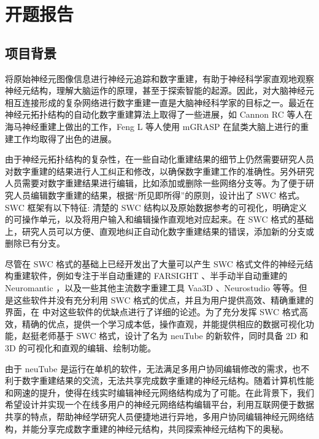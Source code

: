 \chapter*{\zjutitlec 开题报告}

\section{项目背景}
将原始神经元图像信息进行神经元追踪和数字重建，有助于神经科学家直观地观察神经元结构，理解大脑运作的原理，甚至于探索智能的起源。因此，对大脑神经元相互连接形成的复杂网络进行数字重建一直是大脑神经科学家的目标之一。最近在神经元拓扑结构的自动化数字重建算法上取得了一些进展，如 Cannon RC 等人在海马神经重建上做出的工作\cite{Cannon1998An}，Feng L 等人使用 mGRASP 在鼠类大脑上进行的重建工作\cite{Druckmann2014Structured}均取得了出色的进展。

由于神经元拓扑结构的复杂性，在一些自动化重建结果的细节上仍然需要研究人员对数字重建的结果进行人工纠正和修改，以确保数字重建工作的准确性。另外研究人员需要对数字重建结果进行编辑，比如添加或删除一些网络分支等。为了便于研究人员编辑数字重建的结果，根据“所见即所得”的原则，设计出了 SWC 格式\cite{Peng2011Proof}。SWC 框架有以下特征: 清楚的 SWC 结构以及原始数据参考的可视化，明确定义的可操作单元，以及将用户输入和编辑操作直观地对应起来。在 SWC 格式的基础上，研究人员可以方便、直观地纠正自动化数字重建结果的错误，添加新的分支或删除已有分支。

尽管在 SWC 格式的基础上已经开发出了大量可以产生 SWC 格式文件的神经元结构重建软件，例如专注于半自动重建的 FARSIGHT \cite{Luisi2011The}、半手动半自动重建的 Neuromantic \cite{Myatt2012Neuromantic}，以及一些其他主流数字重建工具 Vaa3D \cite{Peng2010Seeing}、Neurostudio \cite{Rodriguez2006Rayburst} 等等。但是这些软件并没有充分利用 SWC 格式的优点，并且为用户提供高效、精确重建的界面，在 \cite{Feng2014neuTube} 中对这些软件的优缺点进行了详细的论述。为了充分发挥 SWC 格式高效，精确的优点，提供一个学习成本低，操作直观，并能提供相应的数据可视化功能，赵挺老师基于 SWC 格式，设计了名为 neuTube 的新软件\cite{Feng2014neuTube}，同时具备 2D 和 3D 的可视化和直观的编辑、绘制功能。

由于 neuTube 是运行在单机的软件，无法满足多用户协同编辑修改的需求，也不利于数字重建结果的交流，无法共享完成数字重建的神经元结构。随着计算机性能和网速的提升，使得在线实时编辑神经元网络结构成为了可能。在此背景下，我们希望设计并实现一个在线多用户的神经元网络结构编辑平台，利用互联网便于数据共享的特点，帮助神经学研究人员便捷地进行异地，多用户协同编辑神经元网络结构，并能分享完成数字重建的神经元结构，共同探索神经元结构下的奥秘。


